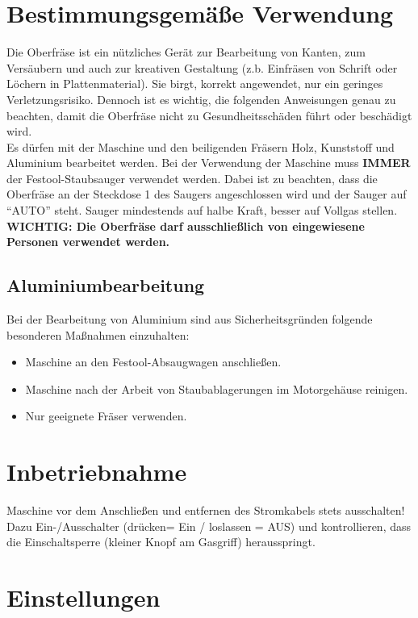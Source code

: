 \documentclass{\basedir/fablab-document}
\begin{document}
\section{Bestimmungsgemäße Verwendung}
Die Oberfräse ist ein nützliches Gerät zur Bearbeitung von Kanten, zum Versäubern und auch zur kreativen Gestaltung (z.b. Einfräsen von Schrift oder Löchern in Plattenmaterial). Sie birgt, korrekt angewendet, nur ein geringes Verletzungsrisiko. Dennoch ist es wichtig, die folgenden Anweisungen genau zu beachten, damit die Oberfräse nicht zu Gesundheitsschäden führt oder beschädigt wird.\\
Es dürfen mit der Maschine und den beiligenden Fräsern Holz, Kunststoff und Aluminium bearbeitet werden. Bei der Verwendung der Maschine muss \textbf{IMMER} der Festool-Staubsauger verwendet werden. Dabei ist zu beachten, dass die Oberfräse an der Steckdose 1 des Saugers angeschlossen wird und der Sauger auf \enquote{AUTO} steht. Sauger mindestends auf halbe Kraft, besser auf Vollgas stellen.\\
\textbf{WICHTIG: Die Oberfräse darf ausschließlich von eingewiesene Personen verwendet werden.}


\subsection{Aluminiumbearbeitung}
Bei der Bearbeitung von Aluminium sind aus Sicherheitsgründen folgende besonderen Maßnahmen einzuhalten:
\begin{itemize}
\item Maschine an den Festool-Absaugwagen anschließen.
\item Maschine nach der Arbeit von Staubablagerungen im Motorgehäuse reinigen.
\item Nur geeignete Fräser verwenden.
\end{itemize}


\section{Inbetriebnahme}
Maschine vor dem Anschließen und entfernen des Stromkabels stets ausschalten! Dazu Ein-/Ausschalter (drücken= Ein / loslassen = AUS) und kontrollieren, dass die Einschaltsperre (kleiner Knopf am Gasgriff) herausspringt.

\section{Einstellungen}
\end{document}
